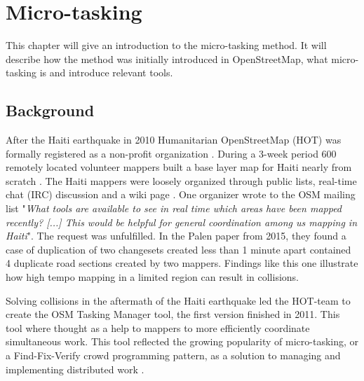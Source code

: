 \chapter{Micro-tasking}

This chapter will give an introduction to the micro-tasking method. It will describe how the method was initially introduced in OpenStreetMap, what micro-tasking is and introduce relevant tools.

\section{Background}
After the Haiti earthquake in 2010 Humanitarian OpenStreetMap (HOT) was formally registered as a non-profit organization \cite{Soden}. During a 3-week period 600 remotely located volunteer mappers built a base layer map for Haiti nearly from scratch \cite{Soden}. The Haiti mappers were loosely organized through public lists, real-time chat (IRC) discussion and a wiki page \cite{Palen2015}. One organizer wrote to the OSM mailing list "\textit{What tools are available to see in real time which areas have been mapped recently? [...] This would be helpful for general coordination among us mapping in Haiti}". The request was unfulfilled. In the Palen paper from 2015, they found a case of duplication of two changesets created less than 1 minute apart contained 4 duplicate road sections created by two mappers. Findings like this one illustrate how high tempo mapping in a limited region can result in collisions. 

Solving collisions in the aftermath of the Haiti earthquake led the HOT-team to create the OSM Tasking Manager tool, the first version finished in 2011. This tool where thought as a help to mappers to more efficiently coordinate simultaneous work. This tool reflected the growing popularity of micro-tasking, or a Find-Fix-Verify crowd programming pattern, as a solution to managing and implementing distributed work \cite{Bernstein2015}.  

